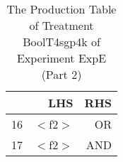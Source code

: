 \begin{table}[ht]
\centering
\begin{tabular}{rrr}
  \hline
 & LHS & RHS \\ 
  \hline
16 & $<$f2$>$ & OR \\ 
  17 & $<$f2$>$ & AND \\ 
   \hline
\end{tabular}
\caption{The Production Table of Treatment BoolT4sgp4k of Experiment ExpE (Part 2)} 
\end{table}
